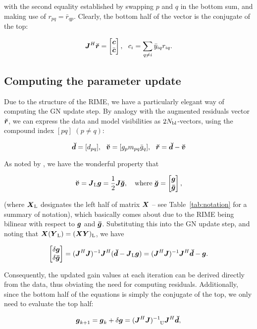 \documentclass[useAMS,usenatbib]{mn2e}
\makeatletter
\newcommand{\vecg}{\bmath{g}}
\newcommand{\vecgc}{\bmath{\bar g}}
\newcommand{\mat}[1]{{\bmath{#1}}}
\newcommand{\JJ}{\mat{J}} %
\newcommand{\JHJ}{\JJ^H\JJ} %
\newcommand{\Matrix}[2]{\left [ \begin{array}{@{}#1@{}}#2\end{array} \right ]}
\newcommand{\AUG}[1]{\bmath{\breve{#1}}}
\newcommand{\Gg}{\AUG{g}}
\newcommand{\Rr}{\AUG{r}}
\newcommand{\Dd}{\AUG{d}}
\newcommand{\Vv}{\AUG{v}}
\newcommand{\TOP}{\mathrm{U}}%
\newcommand{\LEFT}{\mathrm{L}}
\makeatother
\begin{document}
with the second equality established by swapping $p$ and $q$ in the bottom sum, and making use of $r_{pq}=\bar{r}_{qp}$. Clearly, the bottom half of the vector is the conjugate of the top:

\begin{equation}
\label{eq:JHR:DI1}
\JJ^H\Rr = \Matrix{c}{\bmath{c}\\\bar{\bmath{c}}},~~c_i = \sum\limits_{q\ne i} \bar{y}_{iq} r_{iq}.
\end{equation}


\subsection{Computing the parameter update}

Due to the structure of the RIME, we have a particularly elegant way of computing the GN update step.
By analogy with the augmented residuals vector $\Rr$, we can express the data and model visibilities as $2N_\mathrm{bl}$-vectors,
using the compound index $[pq]$ $(p\ne q)$:

\[
\Dd = [ d_{pq} ],~~\Vv = [ g_p m_{pq} \bar{g}_q ],~~\Rr =\Dd-\Vv
\]

As noted by \citet{Tasse-cohjones}, we have the wonderful property that

\begin{equation}
\label{eq:v_Jg}
\Vv = \JJ_\LEFT \bmath{g}  = \frac{1}{2}\JJ \Gg,~~~\mathrm{where}~\Gg = \Matrix{c}{\bmath{g} \\ \bmath{\bar g}},
\end{equation}

(where $\bmath{X}_\LEFT$ designates the left half of matrix $\bmath{X}$ -- see Table~\ref{tab:notation} for a summary of notation),
which basically comes about due to the RIME being bilinear with respect to $\bmath{g}$ and $\bmath{\bar g}$. 
Substituting this into the GN update step, and noting that $\bmath{X}(\bmath{Y}_\LEFT) = (\bmath{XY})_\LEFT$, 
we have 

\[
\Matrix{c}{\delta\vecg\\\delta\vecgc} = (\JHJ)^{-1} \JJ^H (\Dd - \JJ_\LEFT \vecg) = (\JHJ)^{-1} \JJ^H \Dd - \vecg.
\]

Consequently, the updated gain values at each iteration can be derived directly from the data, thus obviating the need
for computing residuals. Additionally, since the bottom half of the equations is simply the conjugate of the top, we only 
need to evaluate the top half:

\begin{equation}
\label{eq:ghat}
\vecg_{k+1} = \vecg_k + \delta\vecg = (\JHJ)^{-1}_{~~~\TOP} \JJ^H \Dd,
\end{equation}
\end{document}
